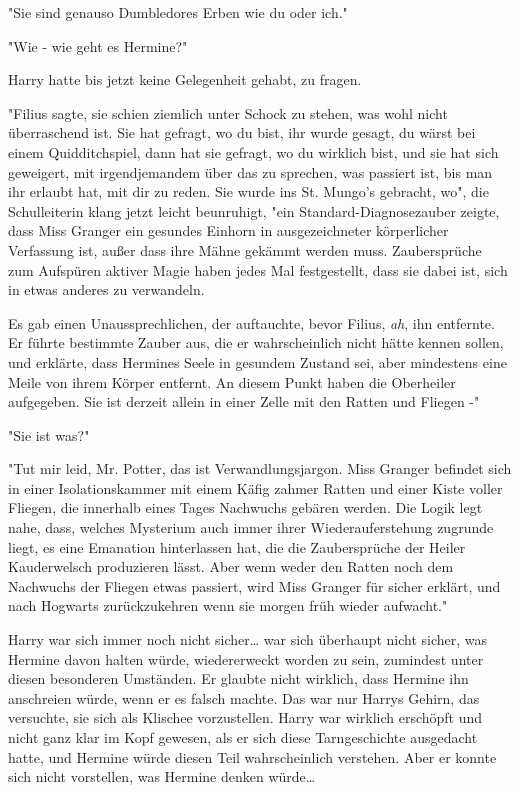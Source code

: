 {"Sie sind genauso Dumbledores Erben wie du oder ich."

"Wie - wie geht es Hermine?"

Harry hatte bis jetzt keine Gelegenheit gehabt, zu fragen.

"Filius sagte, sie schien ziemlich unter Schock zu stehen, was wohl nicht überraschend ist. Sie hat gefragt, wo du bist, ihr wurde gesagt, du wärst bei einem Quidditchspiel, dann hat sie gefragt, wo du wirklich bist, und sie hat sich geweigert, mit irgendjemandem über das zu sprechen, was passiert ist, bis man ihr erlaubt hat, mit dir zu reden. Sie wurde ins St. Mungo's gebracht, wo", die Schulleiterin klang jetzt leicht beunruhigt, "ein Standard-Diagnosezauber zeigte, dass Miss Granger ein gesundes Einhorn in ausgezeichneter körperlicher Verfassung ist, außer dass ihre Mähne gekämmt werden muss. Zaubersprüche zum Aufspüren aktiver Magie haben jedes Mal festgestellt, dass sie dabei ist, sich in etwas anderes zu verwandeln.

Es gab einen Unaussprechlichen, der auftauchte, bevor Filius, \emph{ah}, ihn entfernte. Er führte bestimmte Zauber aus, die er wahrscheinlich nicht hätte kennen sollen, und erklärte, dass Hermines Seele in gesundem Zustand sei, aber mindestens eine Meile von ihrem Körper entfernt. An diesem Punkt haben die Oberheiler aufgegeben. Sie ist derzeit allein in einer Zelle mit den Ratten und Fliegen -"

"Sie ist was?"

"Tut mir leid, Mr. Potter, das ist Verwandlungsjargon. Miss Granger befindet sich in einer Isolationskammer mit einem Käfig zahmer Ratten und einer Kiste voller Fliegen, die innerhalb eines Tages Nachwuchs gebären werden. Die Logik legt nahe, dass, welches Mysterium auch immer ihrer Wiederauferstehung zugrunde liegt, es eine Emanation hinterlassen hat, die die Zaubersprüche der Heiler Kauderwelsch produzieren lässt. Aber wenn weder den Ratten noch dem Nachwuchs der Fliegen etwas passiert, wird Miss Granger für sicher erklärt, und nach Hogwarts zurückzukehren wenn sie morgen früh wieder aufwacht."

Harry war sich immer noch nicht sicher… war sich überhaupt nicht sicher, was Hermine davon halten würde, wiedererweckt worden zu sein, zumindest unter diesen besonderen Umständen. Er glaubte nicht wirklich, dass Hermine ihn anschreien würde, wenn er es falsch machte. Das war nur Harrys Gehirn, das versuchte, sie sich als Klischee vorzustellen. Harry war wirklich erschöpft und nicht ganz klar im Kopf gewesen, als er sich diese Tarngeschichte ausgedacht hatte, und Hermine würde diesen Teil wahrscheinlich verstehen. Aber er konnte sich nicht vorstellen, was Hermine denken würde…

}
